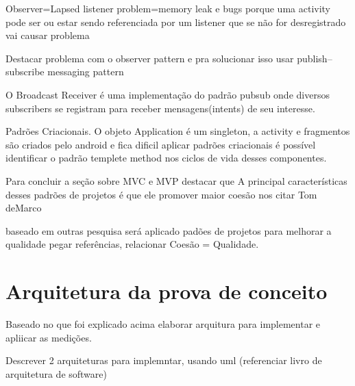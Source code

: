 Observer=Lapsed listener problem=memory leak e bugs porque uma activity pode ser
ou estar sendo referenciada por um listener que se não for desregistrado vai
causar problema

Destacar problema com o observer pattern e pra solucionar isso
usar publish–subscribe messaging pattern

O Broadcast Receiver é uma implementação do padrão pubsub onde diversos
subscribers se registram para receber mensagens(intents) de seu interesse.


Padrões Criacionais. O objeto Application é um singleton, a activity e
fragmentos são criados pelo android e fica dificil aplicar padrões criacionais é
possível identificar o padrão templete method nos ciclos de vida desses
componentes.



 Para concluir a seção sobre MVC e MVP destacar que A principal características
 desses padrões de projetos é que ele promover maior coesão nos citar Tom deMarco 

baseado em outras pesquisa será aplicado padões de projetos  para melhorar a
 qualidade pegar referências,  relacionar Coesão = Qualidade.

\section{Arquitetura da prova de conceito}

Baseado no que foi explicado acima elaborar arquitura para implementar e
apliicar as medições.

Descrever 2 arquiteturas para implemntar, usando uml (referenciar livro de
arquitetura de software)
\fi